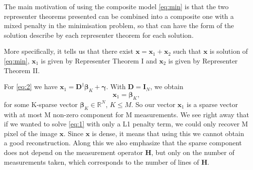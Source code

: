 \documentclass[a4paper,11pt,oneside]{report}
\theoremstyle{named}
\begin{document}
The main motivation of using the composite model \eqref{eq:min} is that the two representer theorems presented can be combined into a composite one \cite{formulation} with a mixed penalty in the minimisation problem, so that can have the form of the solution describe by each representer theorem for each solution.

More specifically, it tells us that there exist $\boldsymbol{x} = \boldsymbol{x}_1 + \boldsymbol{x}_2$ such that $\boldsymbol{x}$ is solution of \eqref{eq:min}, $\boldsymbol{x}_1$ is  given by Representer Theorem I and $\boldsymbol{x}_2$ is given by Representer Theorem II. 

For \eqref{eq:2} we have $\boldsymbol{x}_1 = \boldsymbol{D}^\dagger \boldsymbol{\beta}_K + \boldsymbol{\gamma}$. With $\boldsymbol{D} = \boldsymbol{I}_N$, we obtain
\begin{equation} \label{x1}
    \boldsymbol{x}_1 = \boldsymbol{\beta}_K,
\end{equation}
for some K-sparse vector $\boldsymbol{\beta}_K \in \mathbb{R}^N$, $K\leq M$. So our vector $\boldsymbol{x}_1$ is a sparse vector with at most M non-zero component for M measurements. We see right away that if we wanted to solve \eqref{eq:1} with only a L1 penalty term, we could only recover M pixel of the image $\boldsymbol{x}$. Since $\boldsymbol{x}$ is dense, it means that using this we cannot obtain a good reconstruction. Along this we also emphasize that the sparse component does not depend on the measurement operator $\boldsymbol{H}$, but only on the number of measurements taken, which corresponds to the number of lines of $\boldsymbol{H}$. 
\end{document}
